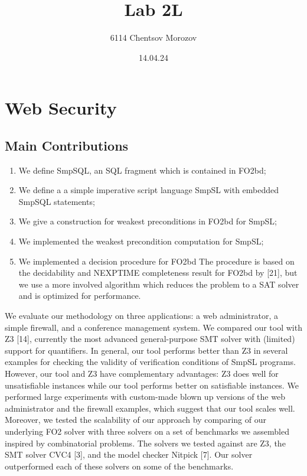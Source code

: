 \documentclass[12pt]{acmart}
\begin{document}
\begin{titlepage}
\title{Lab 2L}
\author{6114 Chentsov Morozov}
\date{14.04.24}
\maketitle
\thispagestyle{empty}
\end{titlepage}


\tableofcontents
\newpage


\section{Web Security}

\subsection{Main Contributions}

\begin{enumerate}
    \item We define SmpSQL, an SQL fragment which is contained in FO2bd;
    \item We define a a simple imperative script language SmpSL with embedded SmpSQL statements;
    \item We give a construction for weakest preconditions in FO2bd for SmpSL;
    \item We implemented the weakest precondition computation for SmpSL;
    \item We implemented a decision procedure for FO2bd The procedure is based on the decidability and NEXPTIME completeness result for FO2bd by [21], but we use a more involved algorithm which reduces the problem to a SAT solver and is optimized for performance.
\end{enumerate}

We evaluate our methodology on three applications: a web administrator, a simple firewall, and a conference management system. We compared our tool with Z3 [14], currently the most advanced general-purpose SMT solver with (limited) support for quantifiers. In general, our tool performs better than Z3 in several examples for checking the validity of verification conditions of SmpSL programs. However, our tool and Z3 have complementary advantages: Z3 does well for unsatisfiable instances while our tool performs better on satisfiable instances. We performed large experiments with custom-made blown up versions of the web administrator and the firewall examples, which suggest that our tool scales well. Moreover, we tested the scalability of our approach by comparing of our underlying FO2 solver with three solvers on a set of benchmarks we assembled inspired by combinatorial problems. The solvers we tested against are Z3, the SMT solver CVC4 [3], and the model checker Nitpick [7]. Our solver outperformed each of these solvers on some of the benchmarks.
\end{document}
